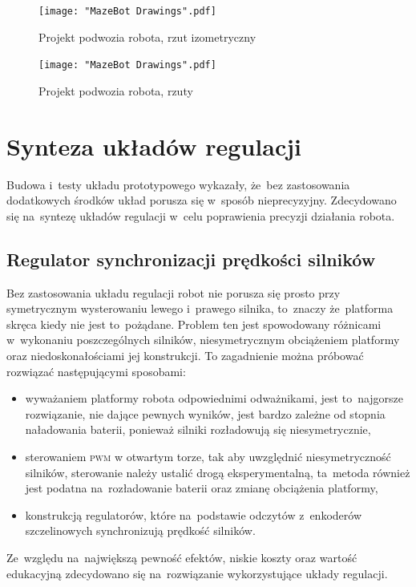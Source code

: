 \documentclass[11pt]{article}
\begin{document}
\begin{figure}
		\centering
		\texttt{[image: "MazeBot Drawings".pdf]}
		\caption{Projekt podwozia robota, rzut izometryczny}
		\label{fig:cad_izo}
\end{figure}

\begin{figure}
		\centering
		\texttt{[image: "MazeBot Drawings".pdf]}
		\caption{Projekt podwozia robota, rzuty}
		\label{fig:cad_multi}
\end{figure}

\section{Synteza układów regulacji}
Budowa i~testy układu prototypowego wykazały, że~bez zastosowania dodatkowych środków układ porusza się w~sposób nieprecyzyjny.
Zdecydowano się na~syntezę układów regulacji w~celu poprawienia precyzji działania robota.
\subsection{Regulator synchronizacji prędkości silników}
Bez zastosowania układu regulacji robot nie porusza się prosto przy symetrycznym wysterowaniu lewego i~prawego silnika, to~znaczy że~platforma skręca kiedy nie jest to~pożądane.
Problem ten jest spowodowany różnicami w~wykonaniu poszczególnych silników, niesymetrycznym obciążeniem platformy oraz niedoskonałościami jej konstrukcji.
To zagadnienie można próbować rozwiązać następującymi sposobami:
\begin{itemize}
	\item wyważaniem platformy robota odpowiednimi odważnikami, jest to~najgorsze rozwiązanie, nie dające pewnych wyników, jest bardzo zależne od stopnia naładowania baterii, ponieważ silniki rozładowują się niesymetrycznie,
	\item sterowaniem \textsc{pwm} w otwartym torze, tak aby uwzględnić niesymetryczność silników, sterowanie należy ustalić drogą eksperymentalną, ta~metoda również jest podatna na~rozładowanie baterii oraz zmianę obciążenia platformy,
	\item konstrukcją regulatorów, które na~podstawie odczytów z~enkoderów szczelinowych synchronizują prędkość silników.
\end{itemize}
Ze~względu na~największą pewność efektów, niskie koszty oraz wartość edukacyjną zdecydowano się na~rozwiązanie wykorzystujące układy regulacji.
\end{document}
